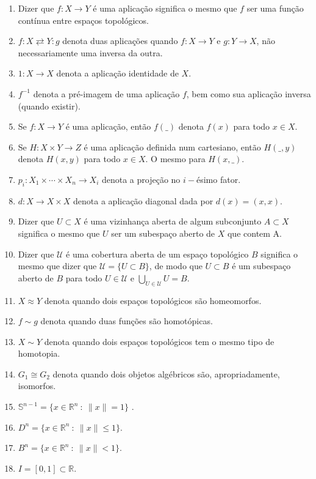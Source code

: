 \documentclass[12pt,oneside]{book} %
\newcommand{\ds}{\displaystyle}
\newcommand{\R}{\mathbb{R}}
\begin{document}
\begin{enumerate}
	
	\item Dizer que $f:X\to Y$ é uma aplicação significa o mesmo que $f$ ser uma função contínua entre espaços topológicos.
	\item $f:X \rightleftarrows Y:g$ denota duas aplicações quando $f:X\to Y$ e $g:Y\to X$, não necessariamente uma inversa da outra. 
	\item $1:X\to X$ denota a aplicação identidade de $X$.
	\item $f^{-1}$ denota a pré-imagem de uma aplicação $f$, bem como sua aplicação inversa (quando existir).
	\item Se $f:X\to Y$ é uma aplicação, então $f(\_)$ denota $f(x)$ para todo $x\in X$.
	\item Se $H:X\times Y\to Z$ é uma aplicação definida num cartesiano, então $H(\_,y)$ denota $H(x,y)$ para todo $x\in X$. O mesmo para $H(x,\_)$.
	\item $p_{i}:X_{1}\times \cdots\times X_{n}\to X_{i}$ denota a projeção no $i-$ésimo fator.
	\item $d:X\to X\times X$ denota a aplicação diagonal dada por $d(x)=(x,x)$.
	\item Dizer que $U\subset X$ é uma vizinhança aberta de algum subconjunto $A\subset X$ significa o mesmo que $U$ ser um subespaço aberto de $X$ que contem A.
	\item Dizer que $\mathcal{U}$ é uma cobertura aberta de um espaço topológico $B$ significa o mesmo que dizer que $\mathcal{U}=\{ U\subset B \}$, de modo que $U\subset B$ é um subespaço aberto de $B$ para todo $U\in\mathcal{U}$ e $\ds\bigcup_{U\in\mathcal{U}}U=B$.
	\item $X \approx Y$ denota quando dois espaços topológicos são homeomorfos.
	\item $f \sim g$ denota quando duas funções são homotópicas.
	\item $X\sim Y$ denota quando dois espaços topológicos tem o mesmo tipo de homotopia.
	\item $G_{1}\cong G_{2}$ denota quando dois objetos algébricos são, apropriadamente, isomorfos.
	\item $\mathbb{S}^{n-1}=\{ x\in\R^{n} \ : \ \| x \|=1 \}$ 	.
	\item $D^{n}=\{ x\in\R^{n} \ : \ \| x \|\leq1 \}$.
	\item $B^{n}=\{ x\in\R^{n} \ : \ \| x \|<1 \}$.								
	\item $I=[0,1]\subset \R$.														

\end{enumerate}
\end{document}
